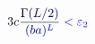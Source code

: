 \documentclass[12pt]{article}
\begin{document}
\makeatletter
\renewcommand*{\@textcolor}[3]{%
  \protect\leavevmode
  \begingroup
    \color#1{#2}#3%
  \endgroup
}
\makeatother
\begin{displaymath}
\mathcolor[RGB]{0,0,15}{3} \mathcolor[RGB]{0,0,30}{c} \mathcolor[RGB]{0,0,45}{\frac { \mathcolor[RGB]{0,0,60}{\Gamma} \mathcolor[RGB]{0,0,75}{(} \mathcolor[RGB]{0,0,90}{L} \mathcolor[RGB]{0,0,105}{/} \mathcolor[RGB]{0,0,120}{2} \mathcolor[RGB]{0,0,135}{)} } { \mathcolor[RGB]{0,0,150}{(} \mathcolor[RGB]{0,0,165}{b} \mathcolor[RGB]{0,0,180}{a} \mathcolor[RGB]{0,0,195}{)} ^ { \mathcolor[RGB]{0,0,210}{L} } } } \mathcolor[RGB]{0,0,225}{<} \mathcolor[RGB]{0,0,240}{\varepsilon} _ { \mathcolor[RGB]{0,0,255}{2} }
\end{displaymath}
\end{document}
